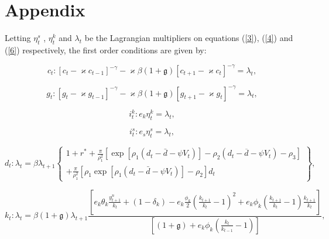 \documentclass[11pt]{article}
\begin{document}
\section{Appendix}

Letting $\eta _{t}^{s}$ , $\eta _{t}^{k}$ and $\lambda _{t}$ be the
Lagrangian multipliers on equations (\ref{3}), (\ref{4}) and (\ref{6})
respectively, the first order conditions are given by:

\begin{equation}
c_{t}:[c_{t}-\varkappa c_{t-1}]^{-\gamma }-\varkappa \beta (1+\mathfrak{g}%
)[c_{t+1}-\varkappa c_{t}]^{-\gamma }=\lambda _{t},  \label{A1}
\end{equation}

\begin{equation}
g_{t}:[g_{t}-\varkappa g_{t-1}]^{-\gamma }-\varkappa \beta (1+\mathfrak{g}%
)[g_{t+1}-\varkappa g_{t}]^{-\gamma }=\lambda _{t},
\end{equation}

\begin{equation}
i_{t}^{k}:e_{k}\eta _{t}^{k}=\lambda _{t},  \label{A3}
\end{equation}

\begin{equation}
i_{t}^{s}:e_{s}\eta _{t}^{s}=\lambda _{t},  \label{A4}
\end{equation}

\begin{equation}
d_{t}:\lambda _{t}=\beta \lambda _{t+1}\left\{ 
\begin{array}{c}
1+r^{\ast }+\frac{\pi }{\rho _{1}^{2}}\left[ \exp \left[ \rho _{1}(d_{t}-%
\bar{d}-\psi V_{t})\right] -\rho _{2}(d_{t}-\overline{d}-\psi V_{t})-\rho
_{3}\right] \\ 
+\frac{\pi }{\rho _{1}^{2}}\left[ \rho _{1}\exp \left[ \rho _{1}(d_{t}-\bar{d%
}-\psi V_{t})\right] -\rho _{2}\right] d_{t}%
\end{array}%
\right\} ,  \label{A5}
\end{equation}

\begin{equation}
k_{t}:\lambda _{t}=\beta (1+\mathfrak{g})\lambda _{t+1}\frac{\left[
e_{k}\theta _{k}\frac{y_{t+1}^{n}}{k_{t}}+(1-\delta _{k})-e_{k}\frac{\phi
_{k}}{2}\left( \frac{k_{t+1}}{k_{t}}-1\right) ^{2}+e_{k}\phi _{k}\left( 
\frac{k_{t+1}}{k_{t}}-1\right) \frac{k_{t+1}}{k_{t}}\right] }{\left[ (1+%
\mathfrak{g})+e_{k}\phi _{k}\left( \frac{k_{t}}{k_{t-1}}-1\right) \right] },
\label{A6}
\end{equation}
\end{document}
